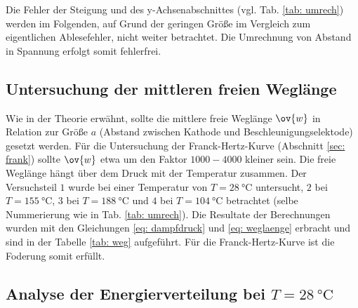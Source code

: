 Die Fehler der Steigung und des y-Achsenabschnittes (vgl. Tab. \ref{tab: umrech}) werden
im Folgenden, auf Grund der geringen Größe im Vergleich zum eigentlichen Ablesefehler, nicht weiter betrachtet.
Die Umrechnung von Abstand in Spannung erfolgt somit fehlerfrei.
\FloatBarrier %

\subsection{Untersuchung der mittleren freien Weglänge}
\FloatBarrier
Wie in der Theorie erwähnt, sollte die mittlere freie Weglänge $\ov{w}$ in Relation zur Größe $a$
(Abstand zwischen Kathode und Beschleunigungselektode) gesetzt werden. Für die Untersuchung der Franck-Hertz-Kurve (Abschnitt \ref{sec: frank}) %
sollte $\ov{w}$ etwa um den Faktor $1000-4000$ kleiner sein. Die freie Weglänge hängt über dem Druck mit der Temperatur zusammen. %
Der Versuchsteil $1$ wurde bei einer Temperatur von $T=\SI{28}{\celsius}$ untersucht, $2$ bei $T=\SI{155}{\celsius}$, %
$3$ bei $T=\SI{188}{\celsius}$ und $4$ bei $T=\SI{104}{\celsius}$ betrachtet (selbe Nummerierung wie in Tab. \ref{tab: umrech}). %
Die Resultate der Berechnungen wurden mit den Gleichungen \eqref{eq: dampfdruck} und \eqref{eq: weglaenge} erbracht und %
sind in der Tabelle \ref{tab: weg} aufgeführt.
Für die Franck-Hertz-Kurve ist die Foderung somit erfüllt. %



\subsection{Analyse der Energierverteilung bei $T=\SI{28}{\celsius}$}

